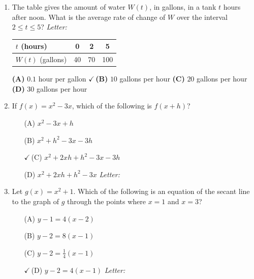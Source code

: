 \documentclass[10pt]{article}
\begin{document}
\begin{enumerate}[leftmargin=1.9em, itemsep=12pt]

\item The table gives the amount of water $W(t)$, in gallons, in a tank $t$ hours after noon.
      What is the average rate of change of $W$ over the interval $2 \le t \le 5$? \hfill\textit{Letter:}~\gradedblank[id=ap1, type=choice, points=1, answer=B]{0.42in}{13pt}

      \smallskip
      \begin{center}
      \renewcommand{\arraystretch}{1.2}
      \begin{tabular}{|l|c|c|c|}
      \hline
      $t$ (hours)     & 0  & 2  & 5   \\ \hline
      $W(t)$ (gallons) & 40 & 70 & 100 \\ \hline
      \end{tabular}
      \end{center}

      \textbf{(A)} $0.1$ hour per gallon \hspace{1.2em} {\color{keyred}\textbf{$\checkmark$\,(B)}} $10$ gallons per hour \hspace{1.2em}
      \textbf{(C)} $20$ gallons per hour \hspace{1.2em} \textbf{(D)} $30$ gallons per hour

\item If $f(x) = x^2 - 3x$, which of the following is $f(x + h)$?
      \begin{enumerate}[leftmargin=2.6em, itemsep=2pt]
        \item[(A)] $x^2 - 3x + h$
        \item[(B)] $x^2 + h^2 - 3x - 3h$
        \item[{\color{keyred}$\checkmark$\,(C)}] $x^2 + 2xh + h^2 - 3x - 3h$
        \item[(D)] $x^2 + 2xh + h^2 - 3x$ \hfill\textit{Letter:}~\gradedblank[id=ap2, type=choice, points=1, answer=C]{0.42in}{13pt}
      \end{enumerate}

\item Let $g(x) = x^2 + 1$. Which of the following is an equation of the secant line to the
      graph of $g$ through the points where $x = 1$ and $x = 3$?
      \begin{enumerate}[leftmargin=2.6em, itemsep=2pt]
        \item[(A)] $y - 1 = 4(x - 2)$
        \item[(B)] $y - 2 = 8(x - 1)$
        \item[(C)] $y - 2 = \tfrac{1}{4}(x - 1)$
        \item[{\color{keyred}$\checkmark$\,(D)}] $y - 2 = 4(x - 1)$ \hfill\textit{Letter:}~\gradedblank[id=ap3, type=choice, points=1, answer=D]{0.42in}{13pt}
      \end{enumerate}


\end{enumerate}
\end{document}

